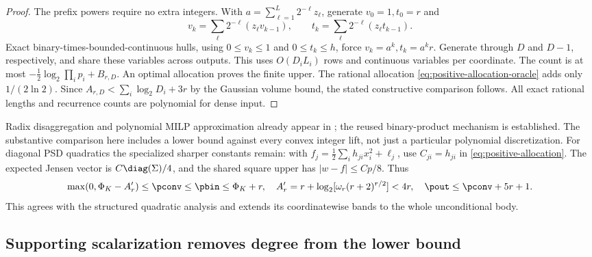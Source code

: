\begin{proof}
The prefix powers require no extra integers. With
$a=\sum_{\ell=1}^L2^{-\ell}z_\ell$, generate $v_0=1,t_0=r$ and
\begin{equation}\label{eq:exact-prefix-powers}
 v_k=\sum_\ell2^{-\ell}(z_\ell v_{k-1}),\qquad
 t_k=\sum_\ell2^{-\ell}(z_\ell t_{k-1}).
\end{equation}
Exact binary-times-bounded-continuous hulls, using $0\le v_k\le1$
and $0\le t_k\le h$, force $v_k=a^k,t_k=a^kr$. Generate through
$D$ and $D-1$, respectively, and share these variables across outputs.
This uses $O(D_iL_i)$ rows and continuous variables per coordinate.
The count is at most $-\frac12\log_2\prod_ip_i+B_{r,D}$.
An optimal allocation proves the finite upper. The rational allocation
\eqref{eq:positive-allocation-oracle} adds only $1/(2\ln2)$.
Since $A_{r,D}<\sum_i\log_2D_i+3r$ by the Gaussian volume bound,
the stated constructive comparison follows. All exact rational lengths
and recurrence counts are polynomial for dense input.
\end{proof}

Radix disaggregation and polynomial MILP approximation already appear in
\citet{teles2013}; the reused binary-product mechanism is established.
The substantive comparison here includes a lower bound against every
convex integer lift, not just a particular polynomial discretization.
For diagonal PSD quadratics the specialized sharper constants remain:
with $f_j=\frac12\sum_ih_{ji}x_i^2+\ell_j$, use $C_{ji}=h_{ji}$
in \eqref{eq:positive-allocation}. The expected Jensen vector is
$C\diag(\Sigma)/4$, and the shared square upper has
$|w-f|\le Cp/8$. Thus
\begin{equation}\label{eq:unconditional-diagonal-sharp}
 \max(0,\Phi_K-A_r')\le\pconv\le\pbin\le\Phi_K+r,
 \quad A_r'=r+\log_2[\omega_r(r+2)^{r/2}]<4r,
 \quad \pout\le\pconv+5r+1.
\end{equation}
This agrees with the structured quadratic analysis and extends its
coordinatewise bands to the whole unconditional body.

\subsection{Supporting scalarization removes degree from the lower bound}

